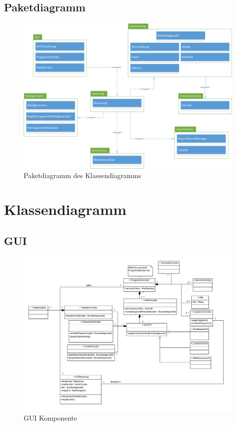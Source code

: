 \documentclass[12pt,a4paper,titlepage]{article}
\begin{document}
\subsection{Paketdiagramm}
\begin{figure}[!ht]
\centering
\includegraphics[scale=0.5]{Paketdiagramm} \caption{Paketdiagramm des Klassendiagramms}
\end{figure}
\newpage
\section{Klassendiagramm}
\subsection{GUI}
\begin{figure}[!ht]
\centering
\includegraphics[scale=0.55]{GUI-Abschnitt.png} \caption{GUI Komponente} 
\end{figure}
\end{document}
